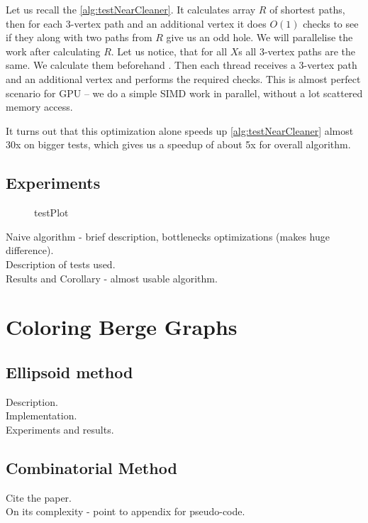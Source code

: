 Let us recall the \cref{alg:testNearCleaner}. It calculates array $R$ of shortest paths, then for each 3-vertex path and an additional vertex it does $O(1)$ checks to see if they along with two paths from $R$ give us an odd hole. We will parallelise the work after calculating $R$. Let us notice, that for all $X$s all 3-vertex paths are the same. We calculate them beforehand  . Then each thread receives a 3-vertex path and an additional vertex and performs the required checks. This is almost perfect scenario for GPU -- we do a simple SIMD work in parallel, without a lot scattered memory access.

It turns out that this optimization alone speeds up \cref{alg:testNearCleaner} almost 30x  on bigger tests, which gives us a speedup of about 5x  for overall algorithm.


\subsection{Experiments}

\begin{figure}
  \centering
  
  \caption{testPlot}
  \label{fig:LCA_batch}
\end{figure}

Naive algorithm - brief description, bottlenecks optimizations (makes huge difference).\\

Description of tests used.\\

Results and Corollary - almost usable algorithm.


\section{Coloring Berge Graphs}

\subsection{Ellipsoid method}

Description.\\

Implementation.\\

Experiments and results.\\

\subsection{Combinatorial Method}

Cite the paper.\\

On its complexity - point to appendix for pseudo-code.